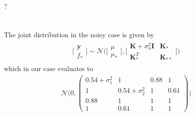 \documentclass[11pt]{article}
\newcommand{\exercise}{\section{}}
\begin{document}
\exercise
?

\exercise
The joint distribution in the noisy case is given by
\begin{align*}
	\Big[
	\begin{matrix}
		\boldsymbol{y}\\
		f_*
	\end{matrix}
	\Big]
	\sim \mathcal{N} \Big(\Big[
	\begin{matrix}
		\mu\\
		\mu_*
	\end{matrix}
	\Big], \Big[
	\begin{matrix}
		\boldsymbol{K} + \sigma^2_n \boldsymbol{I} & \boldsymbol{K}_* \\
		\boldsymbol{K}^T_* & \boldsymbol{K}_{**}
	\end{matrix}
	\Big]
	\Big)
\end{align*}
which in our case evaluates to
\begin{align*}
	\mathcal N \Big(0,
	\begin{pmatrix}
		0.54 + \sigma^2_1 & 1 & 0.88 & 1\\
		1 & 0.54 + \sigma^2_2 & 1 & 0.61\\		
		0.88 & 1 & 1 & 1\\
		1 & 0.61 & 1 & 1
	\end{pmatrix}
	\Big)
\end{align*}
\end{document}
